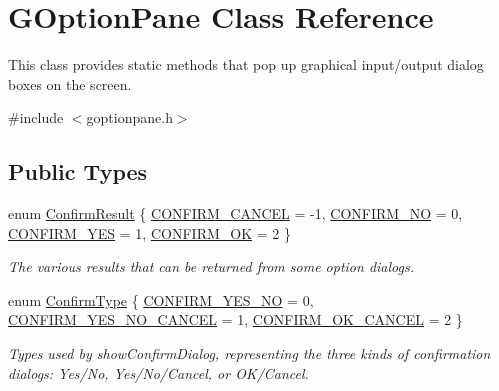 \hypertarget{classsgl_1_1GOptionPane}{}\section{G\+Option\+Pane Class Reference}
\label{classsgl_1_1GOptionPane}


This class provides static methods that pop up graphical input/output dialog boxes on the screen.  




{\ttfamily \#include $<$goptionpane.\+h$>$}

\subsection*{Public Types}
\begin{DoxyCompactItemize}
\item 
enum \mbox{\hyperlink{classsgl_1_1GOptionPane_a1cc9e8685029e39646671ed71f32d47d}{Confirm\+Result}} \{ \mbox{\hyperlink{classsgl_1_1GOptionPane_a1cc9e8685029e39646671ed71f32d47dacd3ba58104ba5a343e0f2fc2839c9202}{C\+O\+N\+F\+I\+R\+M\+\_\+\+C\+A\+N\+C\+EL}} = -\/1, 
\mbox{\hyperlink{classsgl_1_1GOptionPane_a1cc9e8685029e39646671ed71f32d47dafec070235546c9e3ceb562e6e1a0c24e}{C\+O\+N\+F\+I\+R\+M\+\_\+\+NO}} = 0, 
\mbox{\hyperlink{classsgl_1_1GOptionPane_a1cc9e8685029e39646671ed71f32d47da090492ce2b803840f3c07f6f56116ba3}{C\+O\+N\+F\+I\+R\+M\+\_\+\+Y\+ES}} = 1, 
\mbox{\hyperlink{classsgl_1_1GOptionPane_a1cc9e8685029e39646671ed71f32d47dacd7dbef45f6bf553d72a78e7f5389b4c}{C\+O\+N\+F\+I\+R\+M\+\_\+\+OK}} = 2
 \}
\begin{DoxyCompactList}\small\item\em The various results that can be returned from some option dialogs. \end{DoxyCompactList}\item 
enum \mbox{\hyperlink{classsgl_1_1GOptionPane_a6a1aaf19c06f5a6bef89ea6415547049}{Confirm\+Type}} \{ \mbox{\hyperlink{classsgl_1_1GOptionPane_a6a1aaf19c06f5a6bef89ea6415547049a964914d27eb73a202938a53f43adc4b1}{C\+O\+N\+F\+I\+R\+M\+\_\+\+Y\+E\+S\+\_\+\+NO}} = 0, 
\mbox{\hyperlink{classsgl_1_1GOptionPane_a6a1aaf19c06f5a6bef89ea6415547049a534f72dad7322c4a590adef3fccb8745}{C\+O\+N\+F\+I\+R\+M\+\_\+\+Y\+E\+S\+\_\+\+N\+O\+\_\+\+C\+A\+N\+C\+EL}} = 1, 
\mbox{\hyperlink{classsgl_1_1GOptionPane_a6a1aaf19c06f5a6bef89ea6415547049a8c54c3531625688e49c049e608197afb}{C\+O\+N\+F\+I\+R\+M\+\_\+\+O\+K\+\_\+\+C\+A\+N\+C\+EL}} = 2
 \}
\begin{DoxyCompactList}\small\item\em Types used by show\+Confirm\+Dialog, representing the three kinds of confirmation dialogs\+: Yes/\+No, Yes/\+No/\+Cancel, or O\+K/\+Cancel. \end{DoxyCompactList}\item 

\end{DoxyCompactItemize}

